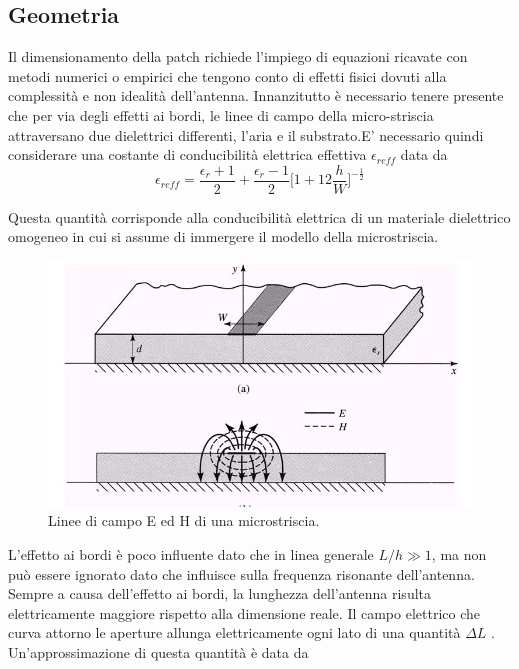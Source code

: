 \documentclass[twoside,twocolumn]{article}
\begin{document}
\subsection*{Geometria}
Il dimensionamento della patch richiede l'impiego di equazioni ricavate con metodi numerici o empirici che tengono conto di effetti fisici dovuti alla complessità e non idealità dell'antenna.
Innanzitutto è necessario tenere presente che per via degli effetti ai bordi, le linee di campo della micro-striscia attraversano due dielettrici differenti, l'aria e il substrato.E' necessario quindi considerare una costante di conducibilità elettrica effettiva $\epsilon_{{reff}}$ data da 
\begin{equation}
\label{eq:emc}
\epsilon_{reff}= \frac{\epsilon_{r}+1}{2}+\frac{\epsilon_{r}-1}{2}\Big[1+12\frac{h}{W}\Big]^{-\frac{1}{2}}
\end{equation}

Questa quantità corrisponde alla conducibilità elettrica di un materiale dielettrico omogeneo in cui si assume di immergere il modello della microstriscia.

\begin{figure}
  \includegraphics[width=\linewidth]{MICROSTRIPlinefield.jpg}
  \caption{Linee di campo E ed H di una microstriscia.}
  \label{fig:linefield}
\end{figure}
L'effetto ai bordi è poco influente dato che in linea generale \(L/h\gg 1\), ma non può essere ignorato dato che influisce sulla frequenza risonante dell'antenna.\\
Sempre a causa dell'effetto ai bordi, la lunghezza dell'antenna risulta elettricamente maggiore rispetto alla dimensione reale.
Il campo elettrico che curva attorno le aperture allunga elettricamente ogni lato di una quantità $\Delta L$ .
Un'approssimazione di questa quantità è data da
\end{document}
